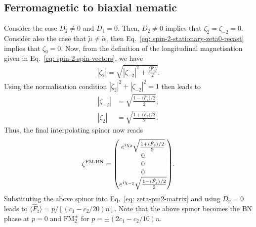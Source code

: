 \subsection{Ferromagnetic to biaxial nematic}
Consider the case \(D_2 \neq 0\) and \(D_1 = 0\).
Then, \(D_2 \neq 0\) implies that \(\zeta_2=\zeta_{-2}=0\).
Consider also the case that \(\tilde{\mu} \neq \tilde{\alpha}\), then
Eq.~\eqref{eq: spin-2-stationary-zeta0-recast} implies that \(\zeta_0=0\).
Now, from the definition of the longitudinal magnetisation given in
Eq.~\eqref{eq: spin-2-spin-vectors}, we have
\begin{align}
    |\zeta_2| = \sqrt{|\zeta_{-2}|^2 + \frac{\langle\hat{F}_z\rangle}{2}}.
\end{align}
Using the normalisation condition \(|\zeta_2|^2 + |\zeta_{-2}|^2 = 1\) then
leads to
\begin{align}
    |\zeta_{-2}| &= \sqrt{\frac{1 - \langle\hat{F}_z\rangle / 2}{2}}, \\
    |\zeta_2| &= \sqrt{\frac{1 + \langle\hat{F}_z\rangle / 2}{2}}.
\end{align}
Thus, the final interpolating spinor now reads
\begin{align}
    \zeta^\text{FM-BN} = \mqty(
        e^{i\chi_2}\sqrt{\frac{1 + \langle\hat{F}_z\rangle / 2}{2}} \\
        0 \\
        0 \\
        0 \\
        e^{i\chi_{-2}}\sqrt{\frac{1 - \langle\hat{F}_z\rangle / 2}{2}}
    ).
\end{align}
Substituting the above spinor into Eq.~\eqref{eq: zeta-pm2-matrix} and using
\(D_2 = 0\) leads to \(\langle \hat{F}_z \rangle = p / [(c_1-c_2/20)n]\).
Note that the above spinor becomes the BN phase at \(p=0\) and
\(\text{FM}_2^\pm\) for \(p = \pm(2c_1-c_2/10)n\).